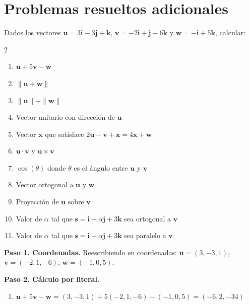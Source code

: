 \section{Problemas resueltos adicionales}


\begin{prob}
Dados los vectores $\mathbf{u} = 3\mathbf{i} - 3\mathbf{j} + \mathbf{k}$, $\mathbf{v} = -2\mathbf{i} + \mathbf{j} - 6\mathbf{k}$ y $\mathbf{w} = -\mathbf{i} + 5\mathbf{k}$, calcular:

\begin{multicols}{2}
\begin{enumerate}[$(a)$]
    \item $\mathbf{u} + 5\mathbf{v} - \mathbf{w}$
    \item $\|\mathbf{u} + \mathbf{w}\|$
    \item $\|\mathbf{u}\| + \|\mathbf{w}\|$
    \item Vector unitario con dirección de $\mathbf{u}$
    \item Vector $\mathbf{x}$ que satisface $2\mathbf{u} - \mathbf{v} + \mathbf{x} = 4\mathbf{x} + \mathbf{w}$
    \item $\mathbf{u} \cdot \mathbf{v}$ y $\mathbf{u} \times \mathbf{v}$
    \item $\cos(\theta)$ donde $\theta$ es el ángulo entre $\mathbf{u}$ y $\mathbf{v}$
    \item Vector ortogonal a $\mathbf{u}$ y $\mathbf{w}$
    \item Proyección de $\mathbf{u}$ sobre $\mathbf{v}$
    \item Valor de $\alpha$ tal que $\mathbf{s} = \mathbf{i} - \alpha\mathbf{j} + 3\mathbf{k}$ sea ortogonal a $\mathbf{v}$
    \item Valor de $\alpha$ tal que $\mathbf{s} = \mathbf{i} - \alpha\mathbf{j} + 3\mathbf{k}$ sea paralelo a $\mathbf{v}$
\end{enumerate}
\end{multicols}

\begin{myproof}
\textbf{Paso 1. Coordenadas.} Reescribiendo en coordenadas: $\mathbf{u} = (3,-3,1)$, $\mathbf{v} = (-2,1,-6)$, $\mathbf{w} = (-1,0,5)$.

\textbf{Paso 2. Cálculo por literal.}
\begin{enumerate}[$(a)$]
\item $\mathbf{u} + 5\mathbf{v} - \mathbf{w} = (3,-3,1) + 5(-2,1,-6) - (-1,0,5) = \boxed{(-6,2,-34)}$


\end{enumerate}
\end{myproof}
\end{prob}
